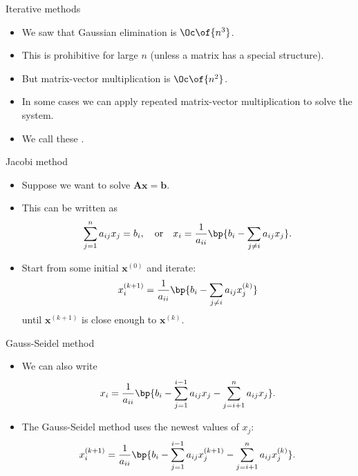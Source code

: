 \documentclass[11pt,xcolor={dvipsnames},aspectratio=159,hyperref={pdftex,pdfpagemode=UseNone,hidelinks,pdfdisplaydoctitle=true},usepdftitle=false]{beamer}
\begin{document}
\begin{frame}{Iterative methods}
    \begin{itemize}
    \item We saw that Gaussian elimination is $\Oc\of{n^3}$.
    \item This is prohibitive for large $n$ (unless a matrix has a special structure).
    \item But matrix-vector multiplication is $\Oc\of{n^2}$.
    \item In some cases we can apply repeated matrix-vector multiplication to solve the system.
    \item We call these .
    \end{itemize}
\end{frame}
    \begin{frame}{Jacobi method}
\begin{itemize}
\item Suppose we want to solve $\mathbf{A}\mathbf{x} = \mathbf{b}$.
\item This can be written as \begin{align*}
    \sum_{j=1}^n a_{ij} x_j = b_i, \quad \text{or} \quad   x_i = \frac{1}{a_{ii}}\bp{b_i - \sum_{j\neq i} a_{ij} x_j}.
\end{align*} 

\item Start from some initial $\mathbf{x}^{(0)}$ and iterate: \begin{align*}
    x_i^{(k+1)} = \frac{1}{a_{ii}}\bp{b_i - \sum_{j\neq i} a_{ij} x_j^{(k)}} 
\end{align*}
until $\mathbf{x}^{(k+1)}$ is close enough to $\mathbf{x}^{(k)}$.
\end{itemize}
\end{frame}


\begin{frame}{Gauss-Seidel method}
\begin{itemize}
    \item We can also write \begin{align*}
        x_i = \frac{1}{a_{ii}}\bp{b_i - \sum_{j=1}^{i-1} a_{ij} x_j - \sum_{j=i+1}^n a_{ij} x_j}.
    \end{align*}
    \item The Gauss-Seidel method uses the newest values of $x_j$: 
    \begin{align*}
        x_i^{(k+1)} = \frac{1}{a_{ii}}\bp{b_i - \sum_{j=1}^{i-1} a_{ij} x_j^{(k+1)} - \sum_{j=i+1}^n a_{ij} x_j^{(k)}}.
    \end{align*}
\end{itemize}
\end{frame}
\end{document}
